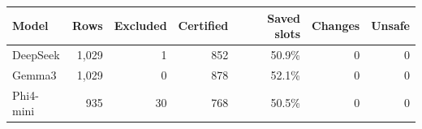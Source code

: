 \begin{tabular}{lrrrrrr}
\toprule
Model & Rows & Excluded & Certified & Saved slots & Changes & Unsafe \\
\midrule
DeepSeek & 1{,}029 & 1 & 852 & 50.9\% & 0 & 0 \\
Gemma3 & 1{,}029 & 0 & 878 & 52.1\% & 0 & 0 \\
Phi4-mini & 935 & 30 & 768 & 50.5\% & 0 & 0 \\
\bottomrule
\end{tabular}
